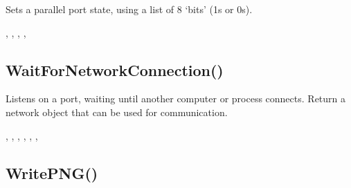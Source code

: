 \documentclass[letterpaper,10pt,english]{sphinxmanual}
\begin{document}
\sphinxAtStartPar
{}

\sphinxAtStartPar
Sets a parallel port state, using a list of 8 ‘bits’ (1s or 0s).

\sphinxAtStartPar
{}

\sphinxAtStartPar
{}, ,  , , 

\ignorespaces 

\subsection{WaitForNetworkConnection()}
\label{\detokenize{reference/peblstream:waitfornetworkconnection}}\label{\detokenize{reference/peblstream:index-35}}
\sphinxAtStartPar
{}

\sphinxAtStartPar
Listens on a port, waiting until another computer or process   connects. Return a network object that can be used for communication.

\sphinxAtStartPar
{}

\begin{sphinxVerbatim}[commandchars=\\\{\}]
\end{sphinxVerbatim}

\sphinxAtStartPar
{}

\sphinxAtStartPar
{}, , , ,    , , 

\ignorespaces 

\subsection{WritePNG()}
\label{\detokenize{reference/peblstream:writepng}}\label{\detokenize{reference/peblstream:index-36}}
\sphinxAtStartPar
{}
\end{document}
